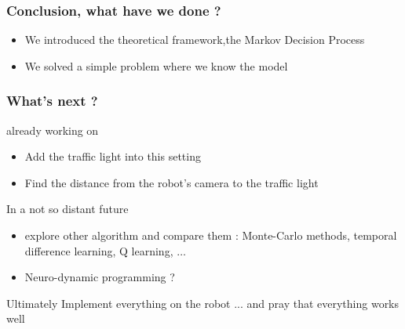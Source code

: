 \documentclass[dvipsnames,svgnames]{beamer}
\begin{document}
\begin{frame}
\frametitle{Conclusion, what have we done ? }
\begin{block}{}
\begin{itemize}
\item We introduced the theoretical framework,the Markov Decision Process
\item We solved a simple problem where we know the model
\end{itemize}
\end{block}
\end{frame}



\begin{frame}
\frametitle{What's next ? }



\begin{block}{already working on}
\begin{itemize}
\item Add the traffic light into this setting
\item Find the distance from the robot's camera to the traffic light
\end{itemize}
\end{block}

\begin{block}{In a not so distant future}
\begin{itemize}
\item explore other algorithm and compare them : Monte-Carlo methods, temporal difference learning, Q learning, $\ldots$
\item Neuro-dynamic programming ?
\end{itemize}
\end{block}

\pause
\begin{block}{Ultimately}
Implement everything on the robot ... \pause and pray that everything works well
\end{block}

\end{frame}
\end{document}
